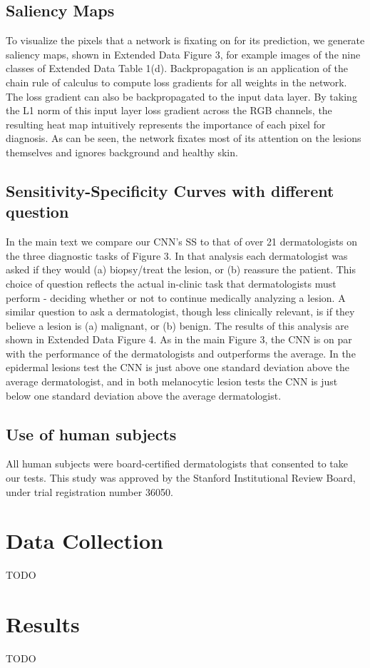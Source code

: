 \subsection{Saliency Maps}
To visualize the pixels that a network is fixating on for its prediction, we generate saliency maps, shown in Extended Data Figure 3, for example images of the nine classes of Extended Data Table 1(d). Backpropagation is an application of the chain rule of calculus to compute loss gradients for all weights in the network. The loss gradient can also be backpropagated to the input data layer. By taking the L1 norm of this input layer loss gradient across the RGB channels, the resulting heat map intuitively represents the importance of each pixel for diagnosis. As can be seen, the network fixates most of its attention on the lesions themselves and ignores background and healthy skin.

\subsection{Sensitivity-Specificity Curves with different question}
In the main text we compare our CNN’s SS to that of over 21 dermatologists on the three diagnostic tasks of Figure 3. In that analysis each dermatologist was asked if they would (a) biopsy/treat the lesion, or (b) reassure the patient. This choice of question reflects the actual in-clinic task that dermatologists must perform - deciding whether or not to continue medically analyzing a lesion. A similar question to ask a dermatologist, though less clinically relevant, is if they believe a lesion is (a) malignant, or (b) benign. The results of this analysis are shown in Extended Data Figure 4. As in the main Figure 3, the CNN is on par with the performance of the dermatologists and outperforms the average. In the epidermal lesions test the CNN is just above one standard deviation above the average dermatologist, and in both melanocytic lesion tests the CNN is just below one standard deviation above the average dermatologist. 

\subsection{Use of human subjects}
All human subjects were board-certified dermatologists that consented to take our tests. This study was approved by the Stanford Institutional Review Board, under trial registration number 36050.

\section{Data Collection}
TODO

\section{Results}
TODO
